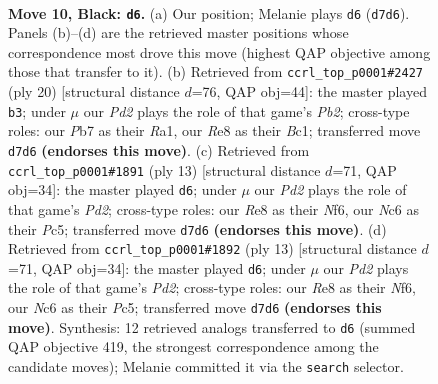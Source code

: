 \documentclass[11pt]{article}
\begin{document}
\clearpage

\begin{figure}[p]\centering
\begin{subfigure}{0.46\textwidth}\centering
\resizebox{\linewidth}{!}{%
\newchessgame
\chessboard[
  setfen={r1b1r1k1/ppppqpp1/2n1pn1p/7P/P1PP4/2P2NP1/3BPP2/R2QKB1R b KQ - 0 10},
  showmover=false,
  pgfstyle=straightmove, color=movearrow, markmove={d7-d6}
]}
\caption{}
\end{subfigure}\hfill
\begin{subfigure}{0.46\textwidth}\centering
\resizebox{\linewidth}{!}{%
\newchessgame
\chessboard[
  setfen={r1bq1rk1/p2nbppp/2p1p3/2ppP3/5P2/2NP1N2/PPP3PP/R1B1QRK1 w - - 3 11},
  showmover=false,
  pgfstyle=straightmove, color=movearrow, markmove={b2-b3}
]}
\caption{}
\end{subfigure}
\\[4pt]
\begin{subfigure}{0.46\textwidth}\centering
\resizebox{\linewidth}{!}{%
\newchessgame
\chessboard[
  setfen={r1bqk2r/pp1p1ppp/2n1pn2/2p5/2PP4/2PBPN2/P4PPP/R1BQK2R b KQkq - 0 7},
  showmover=false,
  pgfstyle=straightmove, color=movearrow, markmove={d7-d6}
]}
\caption{}
\end{subfigure}\hfill
\begin{subfigure}{0.46\textwidth}\centering
\resizebox{\linewidth}{!}{%
\newchessgame
\chessboard[
  setfen={r1bqk2r/pp1p1ppp/2n1pn2/2p5/2PP4/2PBPN2/P4PPP/R1BQK2R b KQkq - 0 7},
  showmover=false,
  pgfstyle=straightmove, color=movearrow, markmove={d7-d6}
]}
\caption{}
\end{subfigure}
\caption{\textbf{Move 10, Black: \texttt{d6}.} (a) Our position; Melanie plays \texttt{d6} (\texttt{d7d6}). Panels (b)--(d) are the retrieved master positions whose correspondence most drove this move (highest QAP objective among those that transfer to it). (b) Retrieved from \texttt{ccrl\_top\_p0001\#2427} (ply 20) [structural distance $d$=76, QAP obj=44]: the master played \texttt{b3}; under $\mu$ our \emph{Pd2} plays the role of that game's \emph{Pb2}; cross-type roles: our \emph{P}b7 as their \emph{R}a1, our \emph{R}e8 as their \emph{B}c1; transferred move \texttt{d7d6} \textbf{(endorses this move)}. (c) Retrieved from \texttt{ccrl\_top\_p0001\#1891} (ply 13) [structural distance $d$=71, QAP obj=34]: the master played \texttt{d6}; under $\mu$ our \emph{Pd2} plays the role of that game's \emph{Pd2}; cross-type roles: our \emph{R}e8 as their \emph{N}f6, our \emph{N}c6 as their \emph{P}c5; transferred move \texttt{d7d6} \textbf{(endorses this move)}. (d) Retrieved from \texttt{ccrl\_top\_p0001\#1892} (ply 13) [structural distance $d$=71, QAP obj=34]: the master played \texttt{d6}; under $\mu$ our \emph{Pd2} plays the role of that game's \emph{Pd2}; cross-type roles: our \emph{R}e8 as their \emph{N}f6, our \emph{N}c6 as their \emph{P}c5; transferred move \texttt{d7d6} \textbf{(endorses this move)}. Synthesis: 12 retrieved analogs transferred to \texttt{d6} (summed QAP objective 419, the strongest correspondence among the candidate moves); Melanie committed it via the \texttt{search} selector.}
\label{fig:thought-m19}
\end{figure}
\end{document}
